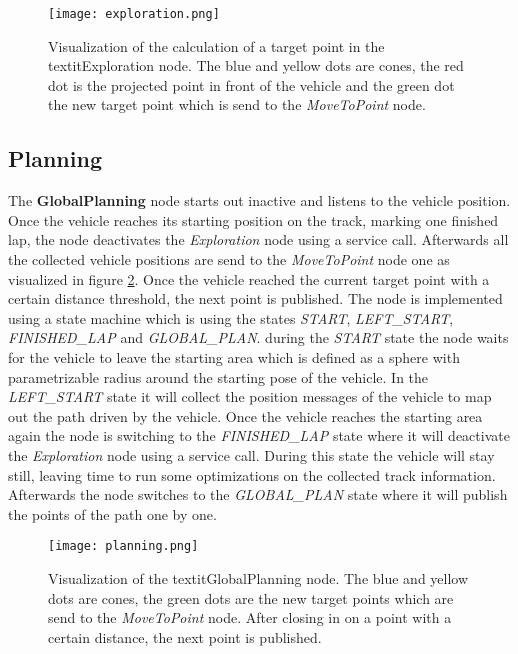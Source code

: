 \begin{figure}[ht]
\vskip 0.2in
\begin{center}
\centerline{\texttt{[image: exploration.png]}}
\caption{Visualization of the calculation of a target point in the textit{Exploration} node. The blue and yellow dots are cones, the red dot is the projected point in front of the vehicle and the green dot the new target point which is send to the \textit{MoveToPoint} node.}
\label{fig:exploration}
\end{center}
\vskip -0.2in
\end{figure}

\subsection{Planning}

The \textbf{GlobalPlanning} node starts out inactive and listens to the vehicle position. Once the vehicle reaches its starting position on the track, marking one finished lap, the node deactivates the \textit{Exploration} node using a service call. Afterwards all the collected vehicle positions are send to the \textit{MoveToPoint} node one as visualized in figure \ref{fig:planning}. Once the vehicle reached the current target point with a certain distance threshold, the next point is published. The node is implemented using a state machine which is using the states \textit{START}, \textit{LEFT\_START}, \textit{FINISHED\_LAP} and \textit{GLOBAL\_PLAN}. during the \textit{START} state the node waits for the vehicle to leave the starting area which is defined as a sphere with parametrizable radius around the starting pose of the vehicle. In the \textit{LEFT\_START} state it will collect the position messages of the vehicle to map out the path driven by the vehicle. Once the vehicle reaches the starting area again the node is switching to the \textit{FINISHED\_LAP} state where it will deactivate the \textit{Exploration} node using a service call. During this state the vehicle will stay still, leaving time to run some optimizations on the collected track information. Afterwards the node switches to the \textit{GLOBAL\_PLAN} state where it will publish the points of the path one by one.


\begin{figure}[ht]
\vskip 0.2in
\begin{center}
\centerline{\texttt{[image: planning.png]}}
\caption{Visualization of the textit{GlobalPlanning} node. The blue and yellow dots are cones, the green dots are the new target points which are send to the \textit{MoveToPoint} node. After closing in on a point with a certain distance, the next point is published.}
\label{fig:planning}
\end{center}
\vskip -0.2in
\end{figure}
